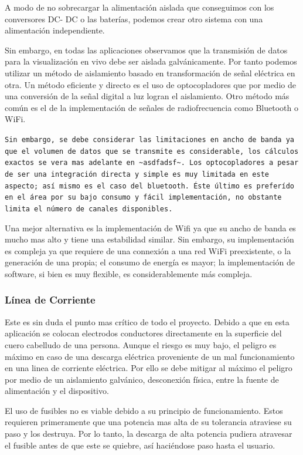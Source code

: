 A modo de no sobrecargar la alimentación aislada que conseguimos con los conversores DC- DC o las baterías, podemos crear otro sistema con una alimentación independiente.

Sin embargo, en todas las aplicaciones observamos que la transmisión de datos para la visualización en vivo debe ser aislada galvánicamente. Por tanto podemos utilizar un método de aislamiento basado en transformación de señal eléctrica en otra. Un método eficiente y directo es el uso de optocopladores que por medio de una conversión de la señal digital a luz logran el aislamiento. Otro método más común es el de la implementación de señales de radiofrecuencia como Bluetooth o WiFi.

\texttt{Sin embargo, se debe considerar las limitaciones en ancho de banda ya que el volumen de datos que se transmite es considerable, los cálculos exactos se vera mas adelante en \textasciitilde{}asdfadsf\textasciitilde{}. Los optocopladores a pesar de ser una integración directa y simple es muy limitada en este aspecto; así mismo es el caso del bluetooth. Éste último es preferído en el área por su bajo consumo y fácil implementación, no obstante limita el número de canales disponibles.}

Una mejor alternativa es la implementación de Wifi ya que su ancho de banda es mucho mas alto y tiene una estabilidad similar. Sin embargo, su implementación es compleja ya que requiere de una connexión a una red WiFi preexistente, o la generación de una propia; el consumo de energía es mayor; la implementación de software, si bien es muy flexible, es considerablemente más compleja.

\subsubsection{Línea de Corriente}
\label{sec:org9bc2d55}
Este es sin duda el punto mas crítico de todo el proyecto. Debido a que en esta aplicación se colocan electrodos conductores directamente en la superficie del cuero cabelludo de una persona. Aunque el riesgo es muy bajo, el peligro es máximo en caso de una descarga eléctrica proveniente de un mal funcionamiento en una linea de corriente eléctrica. Por ello se debe mitigar al máximo el peligro por medio de un aislamiento galvánico, desconexión física, entre la fuente de alimentación y el dispositivo.

El uso de fusibles no es viable debido a su principio de funcionamiento. Estos requieren primeramente que una potencia mas alta de su tolerancia atraviese su paso y los destruya. Por lo tanto, la descarga de alta potencia pudiera atravesar el fusible antes de que este se quiebre, así haciéndose paso hasta el usuario.

